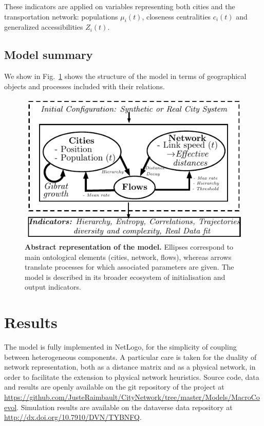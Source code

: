 \documentclass[11pt]{article}
\begin{document}
These indicators are applied on variables representing both cities and the transportation network: populations $\mu_i(t)$, closeness centralities $c_i (t)$ and generalized accessibilities $Z_i (t)$.


\subsection{Model summary}


We show in Fig.~\ref{fig:macrocoevol:model} shows the structure of the model in terms of geographical objects and processes included with their relations.





\begin{figure}
\includegraphics[width=\linewidth]{figures/model}
\caption{\textbf{Abstract representation of the model.} Ellipses correspond to main ontological elements (cities, network, flows), whereas arrows translate processes for which associated parameters are given. The model is described in its broader ecosystem of initialisation and output indicators.\label{fig:macrocoevol:model}}
\end{figure}



\section{Results}


The model is fully implemented in NetLogo, for the simplicity of coupling between heterogeneous components. A particular care is taken for the duality of network representation, both as a distance matrix and as a physical network, in order to facilitate the extension to physical network heuristics. Source code, data and results are openly available on the git repository of the project at \url{https://github.com/JusteRaimbault/CityNetwork/tree/master/Models/MacroCoevol}. Simulation results are available on the dataverse data repository at \url{http://dx.doi.org/10.7910/DVN/TYBNFQ}.
\end{document}
